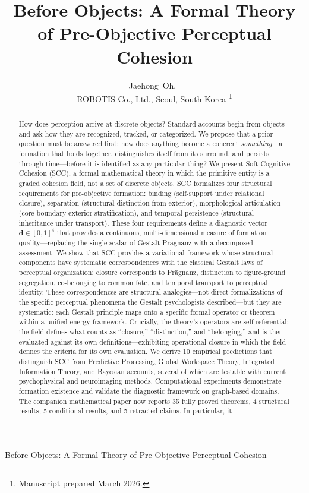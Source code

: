 \documentclass[lettersize,journal]{IEEEtran}
\begin{document}
\title{Before Objects: A Formal Theory of Pre-Objective Perceptual Cohesion}

\author{Jaehong~Oh,~\\
ROBOTIS Co., Ltd., Seoul, South Korea%
\thanks{Manuscript prepared March 2026.}%
}

%
{Before Objects: A Formal Theory of Pre-Objective Perceptual Cohesion}

\maketitle

\begin{abstract}
How does perception arrive at discrete objects? Standard accounts begin from objects and ask how they are recognized, tracked, or categorized. We propose that a prior question must be answered first: how does anything become a coherent \emph{something}---a formation that holds together, distinguishes itself from its surround, and persists through time---before it is identified as any particular thing? We present Soft Cognitive Cohesion (SCC), a formal mathematical theory in which the primitive entity is a graded cohesion field, not a set of discrete objects. SCC formalizes four structural requirements for pre-objective formation: binding (self-support under relational closure), separation (structural distinction from exterior), morphological articulation (core-boundary-exterior stratification), and temporal persistence (structural inheritance under transport). These four requirements define a diagnostic vector $\mathbf{d} \in [0,1]^4$ that provides a continuous, multi-dimensional measure of formation quality---replacing the single scalar of Gestalt Pr\"{a}gnanz with a decomposed assessment. We show that SCC provides a variational framework whose structural components have systematic correspondences with the classical Gestalt laws of perceptual organization: closure corresponds to Pr\"{a}gnanz, distinction to figure-ground segregation, co-belonging to common fate, and temporal transport to perceptual identity. These correspondences are structural analogies---not direct formalizations of the specific perceptual phenomena the Gestalt psychologists described---but they are systematic: each Gestalt principle maps onto a specific formal operator or theorem within a unified energy framework. Crucially, the theory's operators are self-referential: the field defines what counts as ``closure,'' ``distinction,'' and ``belonging,'' and is then evaluated against its own definitions---exhibiting operational closure in which the field defines the criteria for its own evaluation. We derive 10 empirical predictions that distinguish SCC from Predictive Processing, Global Workspace Theory, Integrated Information Theory, and Bayesian accounts, several of which are testable with current psychophysical and neuroimaging methods. Computational experiments demonstrate formation existence and validate the diagnostic framework on graph-based domains. The companion mathematical paper now reports 35 fully proved theorems, 4 structural results, 5 conditional results, and 5 retracted claims. In particular, it 
\end{abstract}
\end{document}
